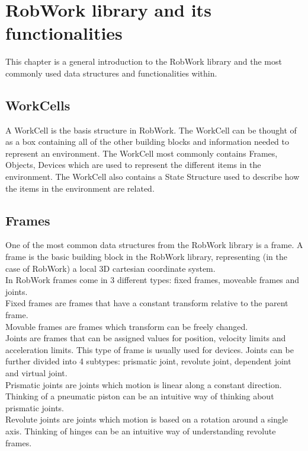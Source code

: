 \section{RobWork library and its functionalities}
This chapter is a general introduction to the RobWork library and the most commonly used data structures and functionalities within.


\subsection{WorkCells}
A WorkCell is the basis structure in RobWork. The WorkCell can be thought of as a box containing all of the other building blocks and information needed to represent an environment. The WorkCell most commonly contains Frames, Objects, Devices which are used to represent the different items in the environment. The WorkCell also contains a State Structure used to describe how the items in the environment are related.


\subsection{Frames}
One of the most common data structures from the RobWork library is a frame. A frame is the basic building block in the RobWork library, representing (in the case of RobWork) a local 3D cartesian coordinate system.\\

In RobWork frames come in 3 different types: fixed frames, moveable frames and joints.\\
Fixed frames are frames that have a constant transform relative to the parent frame.\\
Movable frames are frames which transform can be freely changed.\\
Joints are frames that can be assigned values for position, velocity limits and acceleration limits. This type of frame is usually used for devices. Joints can be further divided into 4 subtypes: prismatic joint, revolute joint, dependent joint and virtual joint.\\

Prismatic joints are joints which motion is linear along a constant direction. Thinking of a pneumatic piston can be an intuitive way of thinking about prismatic joints.\\

Revolute joints are joints which motion is based on a rotation around a single axis. Thinking of hinges can be an intuitive way of understanding revolute frames.\\


